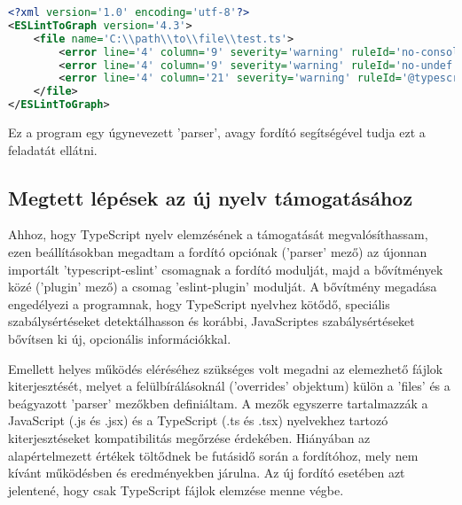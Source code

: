 \begin{lstlisting}[caption={ESLintRunner kimeneti fájl példa},label={lst:eslintoutput}, language={xml}]
<?xml version='1.0' encoding='utf-8'?>
<ESLintToGraph version='4.3'>
    <file name='C:\\path\\to\\file\\test.ts'>
        <error line='4' column='9' severity='warning' ruleId='no-console' nodeType='MemberExpression' message='Unexpected console statement.' />
        <error line='4' column='9' severity='warning' ruleId='no-undef' nodeType='Identifier' message=' &apos; console &apos;  is not defined.' />
        <error line='4' column='21' severity='warning' ruleId='@typescript-eslint/restrict-plus-operands' nodeType='BinaryExpression' message='Operands of  &apos; + &apos;  operation must either be both strings or both numbers. Consider using a template literal.' />
    </file>
</ESLintToGraph>

\end{lstlisting}

Ez a program egy úgynevezett 'parser', avagy fordító segítségével tudja ezt a feladatát ellátni.

\subsection{Megtett lépések az új nyelv támogatásához}

Ahhoz, hogy TypeScript nyelv elemzésének a támogatását megvalósíthassam, ezen beállításokban megadtam a fordító opciónak ('parser' mező) az újonnan importált 'typescript-eslint' \cite{typescript-eslint} csomagnak a fordító modulját, majd a bővítmények közé ('plugin' mező) a csomag 'eslint-plugin' modulját. 
A bővítmény megadása engedélyezi a programnak, hogy TypeScript nyelvhez kötődő, speciális szabálysértéseket detektálhasson és korábbi, JavaScriptes szabálysértéseket bővítsen ki új, opcionális információkkal. 

Emellett helyes működés eléréséhez szükséges volt megadni az elemezhető fájlok kiterjesztését, melyet a felülbírálásoknál ('overrides' objektum) külön a 'files' és a beágyazott 'parser' mezőkben definiáltam. A mezők egyszerre tartalmazzák a JavaScript (.js és .jsx) és a TypeScript (.ts és .tsx) nyelvekhez tartozó kiterjesztéseket kompatibilitás megőrzése érdekében. Hiányában az alapértelmezett értékek töltődnek be futásidő során a fordítóhoz, mely nem kívánt működésben és eredményekben járulna. Az új fordító esetében azt jelentené, hogy csak TypeScript fájlok elemzése menne végbe.

